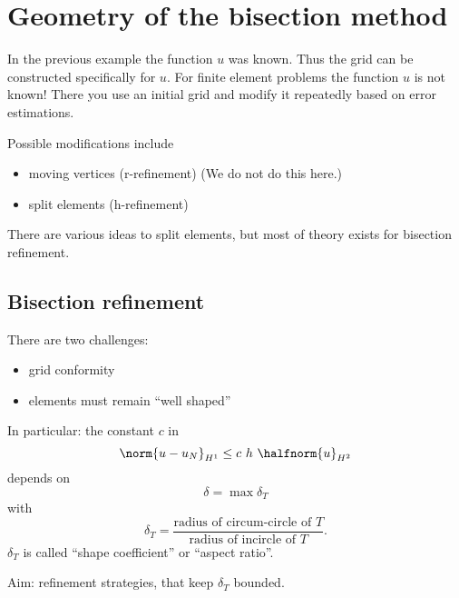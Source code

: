
\chapter{Geometry of the bisection method}
In the previous example the function $u$ was known. Thus the grid can be constructed specifically for $u$. For finite element problems the function $u $ is not known! There you use an initial grid and modify it repeatedly based on error estimations.

Possible modifications include
\begin{itemize}
  \item moving vertices (r-refinement) (We do not do this here.)
	\item split elements (h-refinement)
\end{itemize}
There are various ideas to split elements, but most of theory exists for bisection refinement.
\section{Bisection refinement}

There are two challenges:
\begin{itemize}
	\item grid conformity
	
\item elements must remain \enquote{well shaped}
	
\end{itemize}
In particular: the constant $c$ in
\begin{equation*}
  \norm{u - u_{N}}_{H^{1}} \leq c\ h\ \halfnorm{u}_{H^{2}}
\end{equation*}
depends on
\begin{equation*}
	\delta = \max \delta_{T}
\end{equation*}
with
\begin{equation*}
	\delta_{T}= \frac{\text{radius of circum-circle of }T}{\text{radius of incircle of }T}.
\end{equation*}
$\delta_{T}$ is called \enquote{shape coefficient} or \enquote{aspect ratio}.

Aim: refinement strategies, that keep $\delta_{T}$ bounded.
